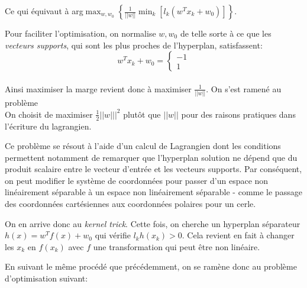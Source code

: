 \documentclass{article}
\theoremstyle{definition}
\begin{document}
\noindent Ce qui équivaut à
arg$\displaystyle\max_{w,w_0}\left\lbrace\frac{1}{||w||}\min_k\left[l_k \left(w^T x_k+w_0\right)\right]\right\rbrace$.

\noindent Pour faciliter l'optimisation, on normalise $w,w_0$ de telle sorte à ce que les \textit{vecteurs supports}, qui sont les plus proches de l'hyperplan, satisfassent:
\begin{equation*}
w^Tx_{k}+w_0=\begin{cases}
	-1\\
	1
\end{cases}
\end{equation*}
\\
\noindent Ainsi maximiser la marge revient donc à maximiser $\frac{1}{||w||}$. On s'est ramené au problème
\\ 

\noindent On choisit de maximiser $\frac{1}{2} ||w|||^2$ plutôt que $||w||$ pour des raisons pratiques dans l'écriture du lagrangien. 

\noindent Ce problème se résout à l'aide d'un calcul de Lagrangien dont les conditions permettent notamment de remarquer que l'hyperplan solution ne dépend que du produit scalaire entre le vecteur d'entrée et les vecteurs supports. Par conséquent, on peut modifier le système de coordonnées pour passer d'un espace non linéairement séparable à un espace non linéairement séparable - comme le passage des coordonnées cartésiennes aux coordonnées polaires pour un cerle.

\noindent On en arrive donc au \textit{kernel trick}. Cette fois, on cherche un hyperplan séparateur $h(x)=w^T f(x)+w_0$ qui vérifie $l_k h(x_k)>0$. Cela revient en fait à changer les $x_k$ en $f(x_k)$ avec $f$ une transformation qui peut être non linéaire.

\noindent En suivant le même procédé que précédemment, on se ramène donc au problème d'optimisation suivant:


\\
\end{document}
